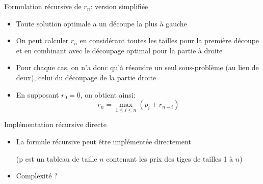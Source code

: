 \begin{frame}{Formulation récursive de $r_n$: version simplifiée}

\begin{itemize}
\item Toute solution optimale a un découpe la plus à gauche
\item On peut calculer $r_n$ en considérant toutes les tailles pour la première découpe et en combinant avec le découpage optimal pour la partie à droite
\item Pour chaque cas, on n'a donc qu'à résoudre un seul sous-problème (au lieu de deux), celui du découpage de la partie droite
\item En supposant $r_0=0$, on obtient ainsi:
$$r_n=\max_{1\leq i \leq n} (p_i+r_{n-i})$$
\end{itemize}


\end{frame}

\begin{frame}{Implémentation récursive directe}

\begin{itemize}
\item La formule récursive peut être implémentée directement

\bigskip

\begin{center}
{\footnotesize
{}
}
\end{center}
(p est un tableau de taille $n$ contenant les prix des tiges de tailles 1 à $n$)
\bigskip
\item Complexité ?
\end{itemize}

\end{frame}

